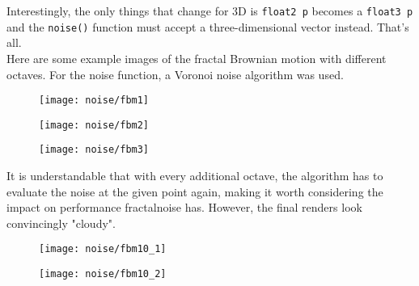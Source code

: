 \noindent
Interestingly, the only things that change for 3D is \lstinline[language=HLSL]{float2 p} becomes a \lstinline[language=HLSL]{float3 p} and the \lstinline[language=HLSL]{noise()} function must accept a three-dimensional vector instead. That's all.
\\
Here are some example images of the fractal Brownian motion with different octaves. For the noise function, a Voronoi noise algorithm was used.
\begin{figure}[H]
    \centering
        \begin{minipage}{0.3\linewidth}
            \texttt{[image: noise/fbm1]}
            \label{img:noise:fbm1}
        \end{minipage}
        \hfill
        \begin{minipage}{0.3\linewidth}
            \texttt{[image: noise/fbm2]}
            \label{img:noise:fbm2}
            \end{minipage}
        \hfill
        \begin{minipage}{0.3\linewidth}
            \texttt{[image: noise/fbm3]}
            \label{img:noise:fbm6}
        \end{minipage}
\end{figure}

\noindent
It is understandable that with every additional octave, the algorithm has to evaluate the noise at the given point again, making it worth considering the impact on performance \gls{fractalnoise} has.
However, the final renders look convincingly "cloudy".

\begin{figure}[H]
    \centering
        \begin{minipage}{0.47\linewidth}
            \texttt{[image: noise/fbm10\_1]}
            \label{img:noise:fbm10_1}
        \end{minipage}
    \hfill
        \begin{minipage}{0.47\linewidth}
            \texttt{[image: noise/fbm10\_2]}
            \label{img:noise:fbm10_2}
        \end{minipage}
\end{figure}